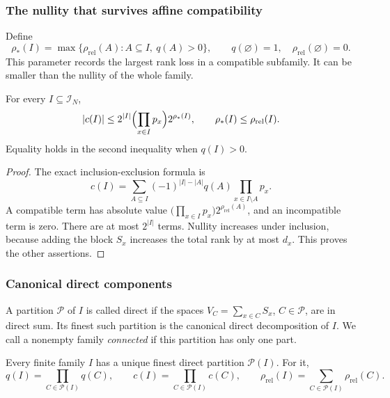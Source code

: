 \subsubsection{The nullity that survives affine compatibility}

Define
\begin{equation}
 \rho_*(I)=\max\{\rho_{\mathrm{rel}}(A):A\subseteq I,\ q(A)>0\},
 \qquad q(\varnothing)=1,\quad\rho_{\mathrm{rel}}(\varnothing)=0 .
 \label{p1:alg:compatible-nullity}
\end{equation}
This parameter records the largest rank loss in a
compatible subfamily. It can be smaller than the
nullity of the whole family.

\begin{lemma}
\label{p1:alg:compatible}
For every \(I\subseteq\mathcal I_N\),
\begin{equation}
 |c(I)|\le 2^{|I|}\Bigl(\prod_{x\in I}p_x\Bigr)2^{\rho_*(I)},\qquad
 \rho_*(I)\le\rho_{\mathrm{rel}}(I).
 \label{p1:alg:compatible-bound}
\end{equation}
Equality holds in the second inequality when \(q(I)>0\).
\end{lemma}

\begin{proof}
The exact inclusion-exclusion formula is
\[
 c(I)=\sum_{A\subseteq I}(-1)^{|I|-|A|}q(A)
                       \prod_{x\in I\setminus A}p_x.
\]
A compatible term has absolute value
\(\bigl(\prod_{x\in I}p_x\bigr)2^{\rho_{\mathrm{rel}}(A)}\), and an incompatible term is
zero. There are at most \(2^{|I|}\) terms.
Nullity increases under inclusion, because adding the block
\(S_x\) increases the total rank by at most \(d_x\). This proves the other assertions.
\end{proof}

\subsubsection{Canonical direct components}

A partition \(\mathcal P\) of \(I\) is called direct if
the spaces \(V_C=\sum_{x\in C}S_x\), \(C\in\mathcal P\),
are in direct sum. Its finest such partition is the
canonical direct decomposition of \(I\).
We call a nonempty family \emph{connected} if this
partition has only one part.

\begin{lemma}
\label{p1:alg:components}
Every finite family \(I\) has a unique finest direct
partition \(\mathcal P(I)\). For it,
\begin{equation}
 q(I)=\prod_{C\in\mathcal P(I)}q(C),\qquad
 c(I)=\prod_{C\in\mathcal P(I)}c(C),\qquad
 \rho_{\mathrm{rel}}(I)=\sum_{C\in\mathcal P(I)}\rho_{\mathrm{rel}}(C).
 \label{p1:alg:factorization}
\end{equation}
\end{lemma}

